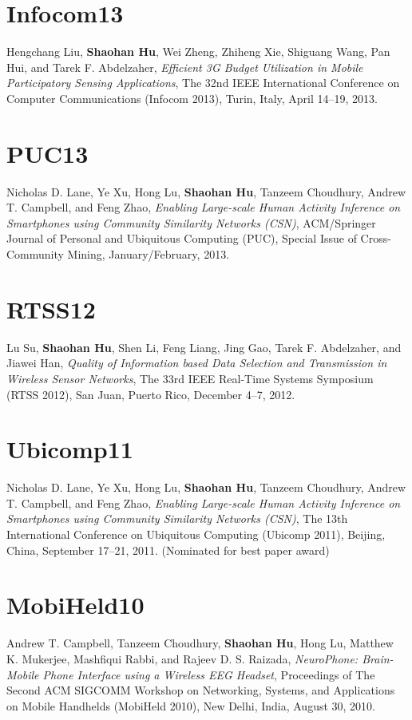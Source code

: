 \section{\sc Infocom13}
Hengchang Liu, \textbf{Shaohan Hu}, Wei Zheng, Zhiheng Xie, Shiguang
Wang, Pan Hui, and Tarek F. Abdelzaher, \emph{Efficient 3G Budget
  Utilization in Mobile Participatory Sensing Applications},
\textsf{The 32nd IEEE International Conference on Computer
  Communications (Infocom 2013)}, Turin, Italy, April 14--19, 2013.

\section{\sc PUC13}
Nicholas D. Lane, Ye Xu, Hong Lu, \textbf{Shaohan Hu}, Tanzeem
Choudhury, Andrew T. Campbell, and Feng Zhao, \emph{Enabling
  Large-scale Human Activity Inference on Smartphones using Community
  Similarity Networks (CSN)}, \textsf{ACM/Springer Journal of Personal
  and Ubiquitous Computing (PUC), Special Issue of Cross-Community
  Mining}, January/February, 2013.

\section{\sc RTSS12}
Lu Su, \textbf{Shaohan Hu}, Shen Li, Feng Liang, Jing Gao, Tarek
F. Abdelzaher, and Jiawei Han, \emph{Quality of Information based Data
  Selection and Transmission in Wireless Sensor Networks}, \textsf{The
  33rd IEEE Real-Time Systems Symposium (RTSS 2012)}, San Juan, Puerto
Rico, December 4--7, 2012.

\section{\sc Ubicomp11}
Nicholas D. Lane, Ye Xu, Hong Lu, \textbf{Shaohan Hu}, Tanzeem
Choudhury, Andrew T. Campbell, and Feng Zhao, \emph{Enabling
  Large-scale Human Activity Inference on Smartphones using Community
  Similarity Networks (CSN)}, \textsf{The 13th International
  Conference on Ubiquitous Computing (Ubicomp 2011)}, Beijing, China,
September 17--21, 2011. (Nominated for best paper award)

\section{\sc MobiHeld10}
Andrew T. Campbell, Tanzeem Choudhury, \textbf{Shaohan Hu}, Hong Lu,
Matthew K. Mukerjee, Mashfiqui Rabbi, and Rajeev D. S. Raizada,
\emph{NeuroPhone: Brain-Mobile Phone Interface using a Wireless EEG
  Headset}, \textsf{Proceedings of The Second ACM SIGCOMM Workshop on
  Networking, Systems, and Applications on Mobile Handhelds (MobiHeld
  2010)}, New Delhi, India, August 30, 2010.

